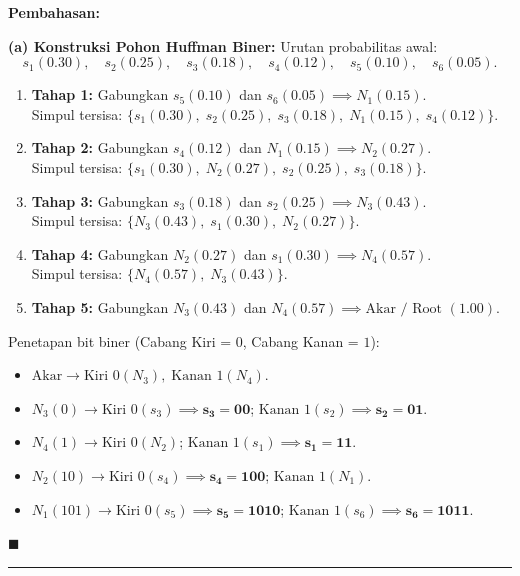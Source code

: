 \documentclass[11pt,a4paper]{article}
\newenvironment{solusi}{\noindent\textbf{\textsf{Pembahasan:}}\par\vspace{0.2em}}{\hfill$\blacksquare$\vspace{1em}\par\hrule\vspace{1em}}
\begin{document}
\begin{solusi}
\textbf{(a) Konstruksi Pohon Huffman Biner:}
Urutan probabilitas awal:
\[
s_1(0.30), \quad s_2(0.25), \quad s_3(0.18), \quad s_4(0.12), \quad s_5(0.10), \quad s_6(0.05).
\]
\begin{enumerate}[leftmargin=*]
    \item \textbf{Tahap 1:} Gabungkan $s_5 (0.10)$ dan $s_6 (0.05) \implies N_1 (0.15)$. \\
    Simpul tersisa: $\{s_1(0.30), \; s_2(0.25), \; s_3(0.18), \; N_1(0.15), \; s_4(0.12)\}$.
    \item \textbf{Tahap 2:} Gabungkan $s_4 (0.12)$ dan $N_1 (0.15) \implies N_2 (0.27)$. \\
    Simpul tersisa: $\{s_1(0.30), \; N_2(0.27), \; s_2(0.25), \; s_3(0.18)\}$.
    \item \textbf{Tahap 3:} Gabungkan $s_3 (0.18)$ dan $s_2 (0.25) \implies N_3 (0.43)$. \\
    Simpul tersisa: $\{N_3(0.43), \; s_1(0.30), \; N_2(0.27)\}$.
    \item \textbf{Tahap 4:} Gabungkan $N_2 (0.27)$ dan $s_1 (0.30) \implies N_4 (0.57)$. \\
    Simpul tersisa: $\{N_4(0.57), \; N_3(0.43)\}$.
    \item \textbf{Tahap 5:} Gabungkan $N_3 (0.43)$ dan $N_4 (0.57) \implies \text{Akar / Root } (1.00)$.
\end{enumerate}

Penetapan bit biner (Cabang Kiri = $0$, Cabang Kanan = $1$):
\begin{itemize}[leftmargin=*]
    \item $\text{Akar} \to \text{Kiri } 0 (N_3), \; \text{Kanan } 1 (N_4)$.
    \item $N_3 (0) \to \text{Kiri } 0 (s_3) \implies \mathbf{s_3 = 00}$; $\text{Kanan } 1 (s_2) \implies \mathbf{s_2 = 01}$.
    \item $N_4 (1) \to \text{Kiri } 0 (N_2)$; $\text{Kanan } 1 (s_1) \implies \mathbf{s_1 = 11}$.
    \item $N_2 (10) \to \text{Kiri } 0 (s_4) \implies \mathbf{s_4 = 100}$; $\text{Kanan } 1 (N_1)$.
    \item $N_1 (101) \to \text{Kiri } 0 (s_5) \implies \mathbf{s_5 = 1010}$; $\text{Kanan } 1 (s_6) \implies \mathbf{s_6 = 1011}$.
\end{itemize}


\end{solusi}
\end{document}
